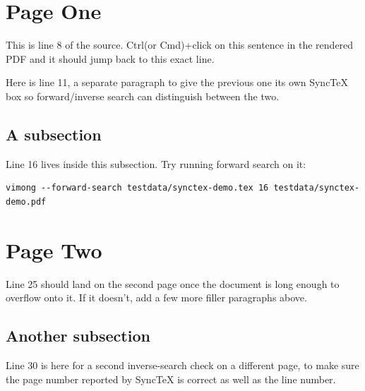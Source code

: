 \documentclass{article}
\begin{document}
\section{Page One}

This is line 8 of the source. Ctrl(or Cmd)+click on this sentence in the
rendered PDF and it should jump back to this exact line.

Here is line 11, a separate paragraph to give the previous one its own
SyncTeX box so forward/inverse search can distinguish between the two.

\subsection{A subsection}

Line 16 lives inside this subsection. Try running forward search on it:

\begin{verbatim}
vimong --forward-search testdata/synctex-demo.tex 16 testdata/synctex-demo.pdf
\end{verbatim}

\clearpage
\section{Page Two}

Line 25 should land on the second page once the document is long enough
to overflow onto it. If it doesn't, add a few more filler paragraphs above.

\subsection{Another subsection}

Line 30 is here for a second inverse-search check on a different page,
to make sure the page number reported by SyncTeX is correct as well as
the line number.
\end{document}
